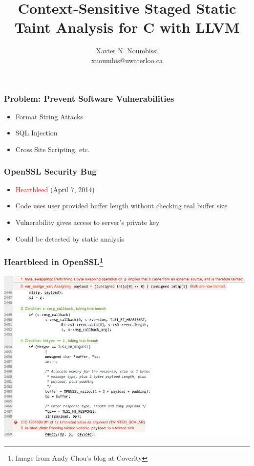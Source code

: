 \documentclass[xcolor=dvipsnames]{beamer}
\title[\waint]
{Context-Sensitive Staged Static Taint Analysis for C with LLVM}
\author[]{Xavier N. Noumbissi\\
\small{xnoumbis@uwaterloo.ca}}
\institute[ECE Graduate Research Seminar]{Department of Electrical and Computer Engineering\\ University of Waterloo}
\date{}
\begin{document}
\begin{frame}
  \titlepage
\end{frame}


\begin{frame}
  \frametitle{Problem: Prevent Software Vulnerabilities} {\Large	
	\begin{itemize}
	 \item Format String Attacks
	 \vspace{0.5cm}
	 \item SQL Injection
	 \vspace{0.5cm}
	 \item Cross Site Scripting, etc.
	\end{itemize}  
	}
\end{frame}


\begin{frame}
  \frametitle{OpenSSL Security Bug} {\large	
	\begin{itemize}
	 \item \textcolor{red}{Heartbleed} (April 7, 2014)
	 \vspace{0.5cm}
	 \item Code uses user provided buffer length without
	       checking real buffer size
	 \vspace{0.5cm}
	 \item Vulnerability gives access to server's private key
	 \vspace{0.5cm}	 
	 	 \item Could be detected by static analysis
	\end{itemize}  
	}
\end{frame}

\begin{frame}
  \frametitle{Heartbleed in OpenSSL\footnote{Image from Andy Chou's blog at Coverity}} {\large	
	\begin{center}
	\includegraphics[scale=0.35]{heartbleed}
	\end{center}   
	}
\end{frame}
\end{document}
